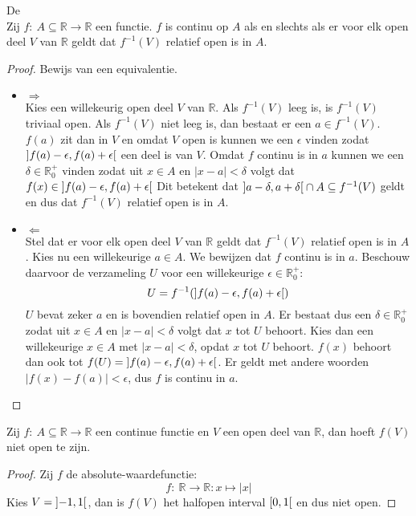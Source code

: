 \documentclass[main.tex]{subfiles}
\begin{document}
\begin{bpr}
  De \\
  Zij $f:\ A \subseteq \mathbb{R} \rightarrow \mathbb{R}$ een functie.
  $f$ is continu op $A$ als en slechts als er voor elk open deel $V$ van $\mathbb{R}$ geldt dat $f^{-1}(V)$ relatief open is in $A$.
  \begin{proof}
    Bewijs van een equivalentie.
    \begin{itemize}
    \item $\Rightarrow$\\
      Kies een willekeurig open deel $V$ van $\mathbb{R}$.
      Als $f^{-1}(V)$ leeg is, is $f^{-1}(V)$ triviaal open.
      Als $f^{-1}(V)$ niet leeg is, dan bestaat er een $a\in f^{-1}(V)$.
      $f(a)$ zit dan in $V$ en omdat $V$ open is kunnen we een $\epsilon$ vinden zodat $\interval[open]{f(a)-\epsilon}{f(a)+\epsilon}$ een deel is van $V$.
      Omdat $f$ continu is in $a$ kunnen we een $\delta\in \mathbb{R}_{0}^{+}$ vinden zodat uit $x\in A$ en $|x-a| < \delta$ volgt dat $f(x) \in \interval[open]{f(a)-\epsilon}{f(a)+\epsilon}$
      Dit betekent dat $\interval[open]{a-\delta}{a+\delta} \cap A \subseteq f^{-1}(V)$ geldt en dus dat $f^{-1}(V)$ relatief open is in $A$.
    \item $\Leftarrow$\\
      Stel dat er voor elk open deel $V$ van $\mathbb{R}$ geldt dat $f^{-1}(V)$ relatief open is in $A$.
      Kies nu een willekeurige $a\in A$.
      We bewijzen dat $f$ continu is in $a$.
      Beschouw daarvoor de verzameling $U$ voor een willekeurige $\epsilon \in \mathbb{R}_{0}^{+}$:
      \[ U = f^{-1}(\interval[open]{f(a)-\epsilon}{f(a)+\epsilon}) \]
      $U$ bevat zeker $a$ en is bovendien relatief open in $A$.
      Er bestaat dus een $\delta \in \mathbb{R}_{0}^{+}$ zodat uit $x\in A$ en $|x-a|< \delta$ volgt dat $x$ tot $U$ behoort.
      Kies dan een willekeurige $x\in A$ met $|x-a|< \delta$, opdat $x$ tot $U$ behoort.
      $f(x)$ behoort dan ook tot $f(U) = \interval[open]{f(a)-\epsilon}{f(a)+\epsilon}$.
      Er geldt met andere woorden $|f(x)-f(a)|<\epsilon$, dus $f$ is continu in $a$.
    \end{itemize}
  \end{proof}
\end{bpr}

\begin{tvb}
  Zij $f:\ A \subseteq \mathbb{R} \rightarrow \mathbb{R}$ een continue functie en $V$ een open deel van $\mathbb{R}$, dan hoeft $f(V)$ niet open te zijn.
  
  \begin{proof}
    Zij $f$ de absolute-waardefunctie:
    \[ f:\ \mathbb{R} \rightarrow \mathbb{R}: x \mapsto |x| \]
    Kies $V = \interval[open]{-1}{1}$, dan is $f(V)$ het halfopen interval $\interval[open right]{0}{1}$ en dus niet open.
  \end{proof}
\end{tvb}
\end{document}
